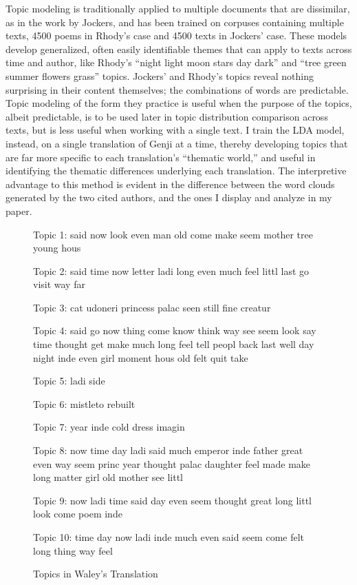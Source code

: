 \documentclass[12pt]{article}
\begin{document}
\begin{flushleft}
\begin{spacing}{2.0}
Topic modeling is traditionally applied to multiple documents that are dissimilar, as in the work by Jockers, and has been trained on corpuses containing multiple texts, 4500 poems in Rhody's case and 4500 texts in Jockers' case. These models develop generalized, often easily identifiable themes that can apply to texts across time and author, like Rhody's ``night light moon stars day dark'' and ``tree green summer flowers grass'' topics. Jockers' and Rhody's topics reveal nothing surprising in their content themselves; the combinations of words are predictable. Topic modeling of the form they practice is useful when the purpose of the topics, albeit predictable, is to be used later in topic distribution comparison across texts, but is less useful when working with a single text. I train the LDA model, instead, on a single translation of Genji at a time, thereby developing topics that are far more specific to each translation's ``thematic world,'' and useful in identifying the thematic differences underlying each translation. The interpretive advantage to this method is evident in the difference between the word clouds generated by the two cited authors, and the ones I display and analyze in my paper.


\begin{figure}
\caption{Topics in Waley's Translation}
\label{waley-topics}
\singlespacing
\small
Topic 1: said now look even man old come make seem mother tree young hous 

Topic 2: said time now letter ladi long even much feel littl last go visit way far 

Topic 3: cat udoneri princess palac seen still fine creatur 

Topic 4: said go now thing come know think way see seem look say time thought get make much long feel tell peopl back last well day night inde even girl moment hous old felt quit take 

Topic 5: ladi side 

Topic 6: mistleto rebuilt 

Topic 7: year inde cold dress imagin 

Topic 8: now time day ladi said much emperor inde father great even way seem princ year thought palac daughter feel made make long matter girl old mother see littl 

Topic 9: now ladi time said day even seem thought great long littl look come poem inde 

Topic 10: time day now ladi inde much even said seem come felt long thing way feel 


\end{figure}
\end{spacing}
\end{flushleft}
\end{document}
